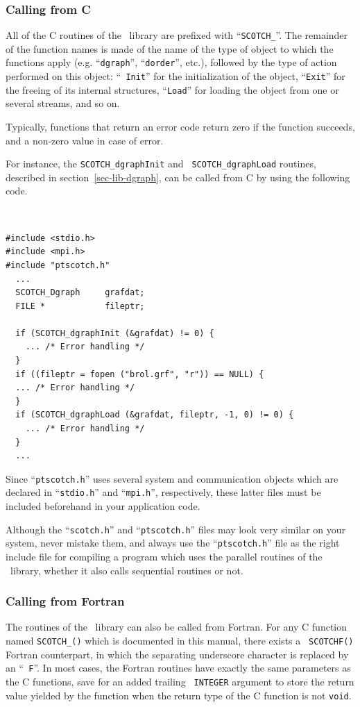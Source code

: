 \subsubsection{Calling from C}

All of the C routines of the \libscotch\ library are prefixed with
``{\tt SCOTCH\_}''. The remainder of the function names is made of the
name of the type of object to which the functions apply (e\@.g\@.
``{\tt dgraph}'', ``{\tt dorder}'', etc.),
followed by the type of action performed on this object: ``{\tt
Init}'' for the initialization of the object, ``{\tt Exit}'' for the
freeing of its internal structures, ``{\tt Load}'' for loading the
object from one or several streams, and so on.

Typically, functions that return an error code return zero if the
function succeeds, and a non-zero value in case of error.

For instance, the {\tt SCOTCH\_\lbt dgraph\lbt Init} and {\tt
SCOTCH\_\lbt dgraph\lbt Load} routines, described in
section~\ref{sec-lib-dgraph}, can be called from C by using the
following code.
{\tt
\begin{verbatim}
#include <stdio.h>
#include <mpi.h>
#include "ptscotch.h"
  ...
  SCOTCH_Dgraph     grafdat;
  FILE *            fileptr;

  if (SCOTCH_dgraphInit (&grafdat) != 0) {
    ... /* Error handling */
  }
  if ((fileptr = fopen ("brol.grf", "r")) == NULL) {
  ... /* Error handling */
  }
  if (SCOTCH_dgraphLoad (&grafdat, fileptr, -1, 0) != 0) {
    ... /* Error handling */
  }
  ...
\end{verbatim}
}

Since ``{\tt ptscotch.h}'' uses several system and communication
objects which are declared in ``{\tt stdio.h}'' and ``{\tt mpi.h}'',
respectively, these latter files must be included beforehand
in your application code.

Although the ``{\tt scotch.h}'' and ``{\tt ptscotch.h}'' files may
look very similar on your system, never mistake them, and always use
the ``{\tt ptscotch.h}'' file as the right include file for compiling
a program which uses the parallel routines of the \libscotch\ library,
whether it also calls sequential routines or not.

\subsubsection{Calling from Fortran}

The routines of the \libscotch\ library can also be called from
Fortran. For any C function named {\tt SCOTCH\_()} which is documented in this manual, there exists a {\tt
SCOTCHF()} Fortran counterpart, in which
the separating underscore character is replaced by an ``{\tt
F}''. In most cases, the Fortran routines have exactly the same
parameters as the C functions, save for an added trailing {\tt
INTEGER} argument to store the return value yielded by the function
when the return type of the C function is not {\tt void}.
\\

